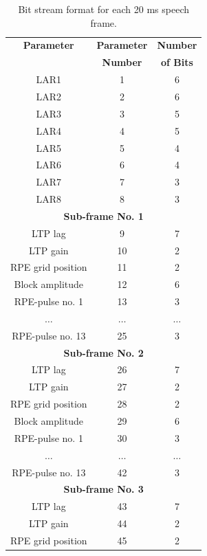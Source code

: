 \documentclass[12pt,a4paper]{book}
\begin{document}
\sf


\begin{table}[htb]
\centering\small
\caption{Bit stream format for each 20 ms speech frame.}
\begin{tabular}{|c|c|c|} \hline
\bf Parameter     & \bf Parameter & \bf Number \\ 
                  & \bf Number    & \bf of Bits\\
\hline
LAR1              &1    & 6 \\
LAR2              &2    & 6 \\
LAR3              &3    & 5 \\
LAR4              &4    & 5 \\
LAR5              &5    & 4 \\
LAR6              &6    & 4 \\
LAR7              &7    & 3 \\
LAR8              &8    & 3 \\ 
\hline
\multicolumn{3}{|c|}{\bf Sub-frame No. 1} \\ 
\hline
LTP lag           &9    & 7 \\
LTP gain          &10   & 2 \\
RPE grid position &11   & 2 \\
Block amplitude   &12   & 6 \\
RPE-pulse no. 1   &13   & 3 \\ 
$\ldots$          &$\ldots$ &$\ldots$\\
RPE-pulse no. 13  &25   & 3 \\ 
\hline
\multicolumn{3}{|c|}{\bf Sub-frame No. 2} \\ 
\hline
LTP lag           &26   & 7 \\
LTP gain          &27   & 2 \\
RPE grid position &28   & 2 \\
Block amplitude   &29   & 6 \\
RPE-pulse no. 1   &30   & 3 \\ 
$\ldots$          &$\ldots$ &$\ldots$\\
RPE-pulse no. 13  &42   & 3 \\ 
\hline
\multicolumn{3}{|c|}{\bf Sub-frame No. 3} \\ 
\hline
LTP lag           &43   & 7 \\
LTP gain          &44   & 2 \\
RPE grid position &45   & 2 \\

\end{tabular}
\end{table}
\end{document}
